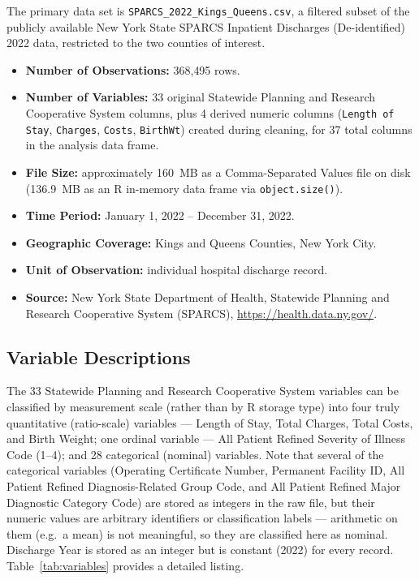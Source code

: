 \documentclass[12pt]{article}
\begin{document}
The primary data set is \texttt{SPARCS\_2022\_Kings\_Queens.csv}, a
filtered subset of the publicly available New York State SPARCS
Inpatient Discharges (De-identified) 2022 data, restricted to the two
counties of interest.

\begin{itemize}[nosep]
    \item \textbf{Number of Observations:} 368{,}495 rows.
    \item \textbf{Number of Variables:} 33 original Statewide Planning and Research Cooperative System columns, plus
      4 derived numeric columns (\texttt{Length of Stay}, \texttt{Charges},
      \texttt{Costs}, \texttt{BirthWt}) created during cleaning, for 37
      total columns in the analysis data frame.
    \item \textbf{File Size:} approximately 160~MB as a Comma-Separated Values file on disk
      (136.9~MB as an R in-memory data frame via \texttt{object.size()}).
    \item \textbf{Time Period:} January 1, 2022 -- December 31, 2022.
    \item \textbf{Geographic Coverage:} Kings and Queens Counties, New York City.
    \item \textbf{Unit of Observation:} individual hospital discharge record.
    \item \textbf{Source:} New York State Department of Health,
      Statewide Planning and Research Cooperative System (SPARCS),
      \url{https://health.data.ny.gov/}.
\end{itemize}

\subsection{Variable Descriptions}

The 33 Statewide Planning and Research Cooperative System variables can be classified by measurement scale (rather than by R storage type) into four truly quantitative (ratio-scale) variables — Length of Stay, Total Charges, Total Costs, and Birth Weight; one ordinal variable — All Patient Refined Severity of Illness Code (1--4); and 28 categorical (nominal) variables. Note that several of the categorical variables (Operating Certificate Number, Permanent Facility ID, All Patient Refined Diagnosis-Related Group Code, and All Patient Refined Major Diagnostic Category Code) are stored as integers in the raw file, but their numeric values are arbitrary identifiers or classification labels — arithmetic on them (e.g.\ a mean) is not meaningful, so they are classified here as nominal. Discharge Year is stored as an integer but is constant (2022) for every record. Table~\ref{tab:variables} provides a detailed listing.
\end{document}

